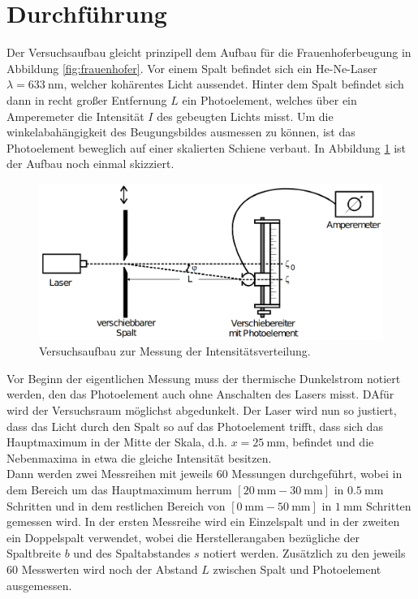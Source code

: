 \section{Durchführung}
\label{sec:Durchführung}
Der Versuchsaufbau gleicht prinzipell dem Aufbau für die Frauenhoferbeugung in Abbildung \ref{fig:frauenhofer}. Vor einem Spalt 
befindet sich ein He-Ne-Laser $\lambda=\SI{633}{\nano\metre}$, welcher kohärentes Licht aussendet. Hinter dem Spalt befindet sich dann in 
recht großer Entfernung $L$ ein Photoelement, welches über ein Amperemeter die Intensität $I$ des gebeugten Lichts misst. Um die 
winkelabahängigkeit des Beugungsbildes ausmessen zu können, ist das Photoelement beweglich auf einer skalierten Schiene verbaut.
In Abbildung \ref{fig:aufbau} ist der Aufbau noch einmal skizziert.
\begin{figure}[H]
    \centering
    \includegraphics[scale = 0.35]{pictures/aufbau.png}
    \caption{Versuchsaufbau zur Messung der Intensitätsverteilung. \cite{AP01}}
    \label{fig:aufbau}
\end{figure}

\noindent
Vor Beginn der eigentlichen Messung muss der thermische Dunkelstrom notiert werden, den das Photoelement auch ohne Anschalten des Lasers
misst. DAfür wird der Versuchsraum möglichst abgedunkelt. Der Laser wird nun so justiert, dass das Licht durch den Spalt so auf das Photoelement trifft, 
dass sich das Hauptmaximum in der Mitte der Skala, d.h. $x=\SI{25}{\milli\metre}$, befindet und die Nebenmaxima in etwa die gleiche Intensität besitzen. 
\\\noindent
Dann werden zwei Messreihen 
mit jeweils $\num{60}$ Messungen durchgeführt, wobei in dem Bereich um das Hauptmaximum herrum $[\SI{20}{\milli\metre}-\SI{30}{\milli\metre}]$
in $\SI{0.5}{\milli\metre}$ Schritten und in dem restlichen Bereich von $[\SI{0}{\milli\metre}-\SI{50}{\milli\metre}]$ in $\SI{1}{\milli\metre}$
Schritten gemessen wird. In der ersten Messreihe wird ein Einzelspalt und in der zweiten ein Doppelspalt verwendet, wobei die 
Herstellerangaben bezügliche der Spaltbreite $b$ und des Spaltabstandes $s$ notiert werden. Zusätzlich zu den jeweils $\num{60}$ Messwerten 
wird noch der Abstand $L$ zwischen Spalt und Photoelement ausgemessen. 